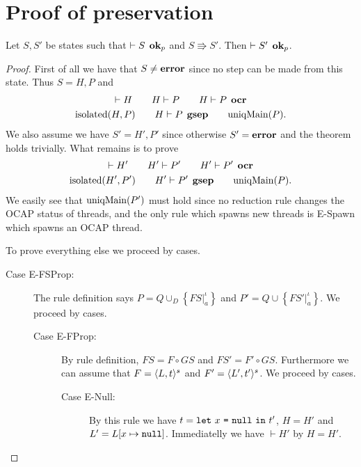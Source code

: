 \section{Proof of preservation}
\label{sec:proof_of_preservation}

\begin{theorem*}[Preservation]
  Let $S, S'$ be states such that $\vdash S \:\: \mbox{{\bf ok}$_p$}$ and $S \Rrightarrow
  S'$. Then $\vdash S' \:\: \mbox{{\bf ok}$_p$}$.
\end{theorem*}

\begin{proof} 
  First of all we have that $S \neq \mbox{{\bf error}}$ since no step can be made from this
  state. Thus $S = H, P$ and
  \begin{equation*}
    \begin{gathered}
      \vdash H \quad\quad H \vdash P \quad\quad H \vdash P \:\: \mbox{\bf ocr} \\
      \mbox{$\mathrm{isolated}$}{(H, P)} \quad\quad H \vdash P \:\: \mbox{\bf gsep} \quad\quad \mbox{$\mathrm{uniqMain}$}(P).
    \end{gathered}
  \end{equation*}
  We also assume we have $S' = H', P'$ since otherwise $S' = \mbox{{\bf error}}$ and the
  theorem holds trivially. What remains is to prove
  \begin{equation*}
    \begin{gathered}
      \vdash H' \quad\quad H' \vdash P' \quad\quad H' \vdash P' \:\: \mbox{\bf ocr} \\
      \mbox{$\mathrm{isolated}$}{(H', P')} \quad\quad H' \vdash P' \:\: \mbox{\bf gsep} \quad\quad
      \mbox{$\mathrm{uniqMain}$}(P).
    \end{gathered}
  \end{equation*}
  We easily see that $\mbox{$\mathrm{uniqMain}$}(P')$ must hold since no reduction rule changes
  the OCAP status of threads, and the only rule which spawns new threads is {\sc
  E-Spawn} which spawns an OCAP thread.

  To prove everything else we proceed by cases.
  \begin{description}
    \item[Case {\sc E-FSProp}:] The \EFSProp{} rule definition says $P =
      Q \cup_D \left\{ FS|_a^\iota \right\}$ and $P' = Q \cup \left\{
        FS'|_a^\iota \right\}$. We proceed by cases.
      \begin{description}
        \item[Case {\sc E-FProp}:] By \EFProp{} rule definition, $FS = F \circ
          GS$ and $FS' = F' \circ GS$. Furthermore we can assume
          that $F = \mbox{$\langle L, t \rangle^s$}$ and $F' = \mbox{$\langle L', t' \rangle^s$}$.
          We proceed by cases.
          \begin{description}
            \item[Case {\sc E-Null}:] By this rule we have $t =
              \mbox{\mdseries\texttt{let}~$x$~\texttt{=}~$\mbox{\mdseries\texttt{null}}$~\texttt{in}~$t'$}$, $H = H'$ and $L' = L[x \mapsto \mbox{\mdseries\texttt{null}}]$.
              Immediatelly we have $\vdash H'$ by $H = H'$.


\end{description}
\end{description}
\end{description}
\end{proof}
